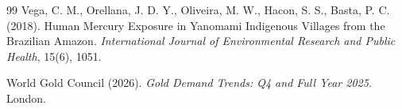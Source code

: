 \documentclass[11pt]{article}
\begin{document}
\begin{thebibliography}{99}
Vega, C. M., Orellana, J. D. Y., Oliveira, M. W., Hacon, S. S., Basta, P. C. (2018).
Human Mercury Exposure in Yanomami Indigenous Villages from the Brazilian Amazon.
\textit{International Journal of Environmental Research and Public Health}, 15(6), 1051.

World Gold Council (2026).
\textit{Gold Demand Trends: Q4 and Full Year 2025}. London.

\end{thebibliography}
\end{document}
